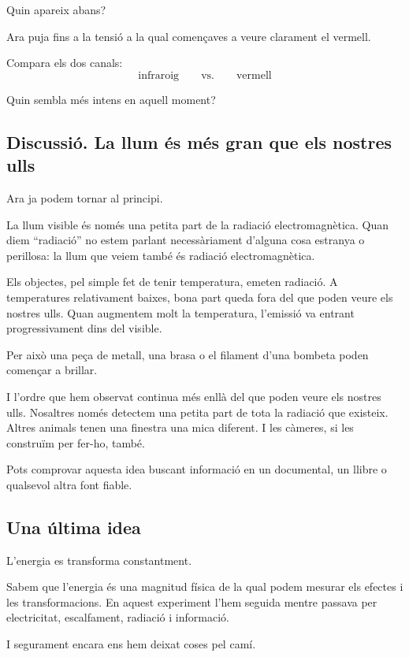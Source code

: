Quin apareix abans?

Ara puja fins a la tensió a la qual començaves a veure clarament el vermell.

Compara els dos canals:
\[
\text{infraroig}
\qquad\text{vs.}\qquad
\text{vermell}
\]

Quin sembla més intens en aquell moment?

\subsection{Discussió. La llum és més gran que els nostres ulls}

Ara ja podem tornar al principi.

La llum visible és només una petita part de la radiació electromagnètica. Quan diem ``radiació'' no estem parlant necessàriament d'alguna cosa estranya o perillosa: la llum que veiem també és radiació electromagnètica.

Els objectes, pel simple fet de tenir temperatura, emeten radiació. A temperatures relativament baixes, bona part queda fora del que poden veure els nostres ulls. Quan augmentem molt la temperatura, l'emissió va entrant progressivament dins del visible.

Per això una peça de metall, una brasa o el filament d'una bombeta poden començar a brillar.

I l'ordre que hem observat continua més enllà del que poden veure els nostres ulls. Nosaltres només detectem una petita part de tota la radiació que existeix. Altres animals tenen una finestra una mica diferent. I les càmeres, si les construïm per fer-ho, també.

Pots comprovar aquesta idea buscant informació en un documental, un llibre o qualsevol altra font fiable.


\subsection{Una última idea}

L'energia es transforma constantment.

Sabem que l'energia és una magnitud física de la qual podem mesurar els efectes i les transformacions. En aquest experiment l'hem seguida mentre passava per electricitat, escalfament, radiació i informació.

I segurament encara ens hem deixat coses pel camí.
